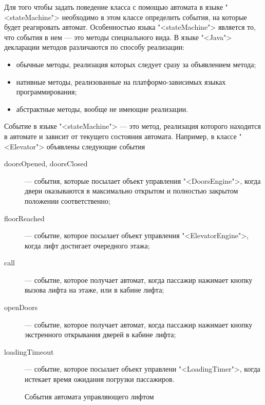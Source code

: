 Для того чтобы задать поведение класса с помощью автомата в языке "<stateMachine"> необходимо в этом классе определить события, на которые будет реагировать автомат. Особенностью языка "<stateMachine"> является то, что события в нем --- это методы специального вида. В языке "<Java"> декларации методов различаются по способу реализации:
\begin{itemize}
 \item обычные методы, реализация которых следует сразу за объявлением метода;
 \item нативные методы, реализованные на платформо-зависимых языках программирования;
 \item абстрактные методы, вообще не имеющие реализации.
\end{itemize}
Событие в языке "<stateMachine"> --- это метод, реализация которого находится в автомате и зависит от текущего состояния автомата. Например, в классе "<Elevator"> объявлены следующие события \pic{\ref{fig:ElevatorEvents}}
\begin{description}
 \item[doorsOpened, doorsClosed] --- события, которые посылает объект управления "<DoorsEngine">, когда двери оказываются в максимально открытом и полностью закрытом положении соответственно;
 \item[floorReached] --- событие, которое посылает объект управления "<ElevatorEngine">, когда лифт достигает очередного этажа;
 \item[call] --- событие, которое получает автомат, когда пассажир нажимает кнопку вызова лифта на этаже, или в кабине лифта;
 \item[openDoors] --- событие, которое получает автомат, когда пассажир нажимает кнопку экстренного открывания дверей в кабине лифта;
 \item[loadingTimeout] --- событие, которое посылает объект управлени "<LoadingTimer">, когда истекает время ожидания погрузки пассажиров.
\end{description}
\begin{figure}
 \centering
 \caption{События автомата управляющего лифтом}
 \label{fig:ElevatorEvents}
\end{figure}
